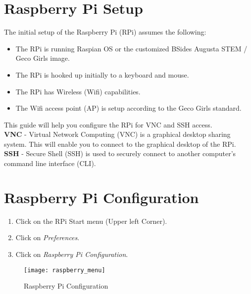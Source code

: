\documentclass[
a4paper,
fontsize=14pt, %
pagesize, %
parskip=half-, %
]{scrartcl} %
\theoremstyle{mythmstyle} %
\begin{document}
\clearpage

\clearpage
\section{Raspberry Pi Setup}
The initial setup of the Raspberry Pi (RPi) assumes the following:

\begin{itemize}
    \item The RPi is running Raspian OS or the customized BSides Augusta STEM / Geco Girls image.
    \item The RPi is hooked up initially to a keyboard and mouse.
    \item The RPi has Wireless (Wifi) capabilities.
    \item The Wifi access point (AP) is setup according to the Geco Girls standard. 
\end{itemize}

This guide will help you configure the RPi for VNC and SSH access.\\

\textbf{VNC} - Virtual Network Computing (VNC) is a graphical desktop sharing system.  This will enable you to connect to the graphical desktop of the RPi.\\

\textbf{SSH} - Secure Shell (SSH) is used to securely connect to another computer's command line interface (CLI).

\clearpage

\section{Raspberry Pi Configuration}
\begin{enumerate}
    \item Click on the RPi Start menu (Upper left Corner).
    \item Click on \emph{Preferences}.
    \item Click on \emph{Raspberry Pi Configuration}.
\end{enumerate}


\begin{figure}[h]
    \centering\texttt{[image: raspberry\_menu]}
    \caption{Raspberry Pi Configuration}
\end{figure}
\end{document}
